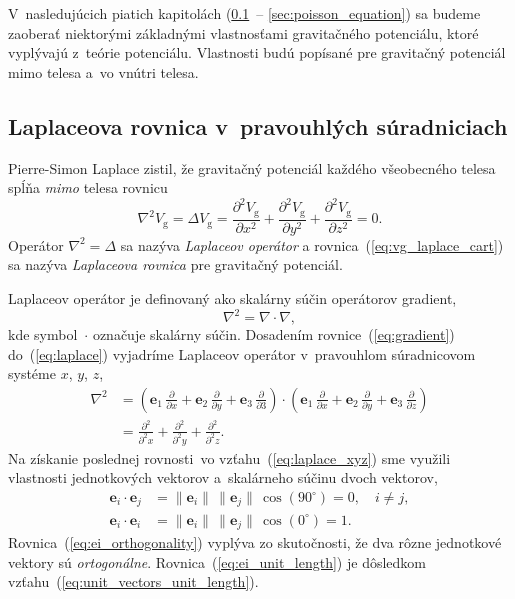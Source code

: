 \documentclass[a4paper,12pt]{book}
\newcommand{\gidx}{\mathrm g}
\let\vec\mathbf
\begin{document}
V~nasledujúcich piatich kapitolách (\ref{sec:laplace_equation_cart}~--
\ref{sec:poisson_equation}) sa budeme zaoberať niektorými základnými
vlastnosťami gravitačného potenciálu, ktoré vyplývajú z~teórie potenciálu.
Vlastnosti budú popísané pre gravitačný potenciál mimo telesa a~vo vnútri
telesa.





\subsection{Laplaceova rovnica v~pravouhlých súradniciach}
\label{sec:laplace_equation_cart}

Pierre-Simon Laplace zistil, že gravitačný potenciál každého všeobecného telesa
spĺňa \emph{mimo} telesa rovnicu
%
\begin{equation}
\label{eq:vg_laplace_cart}
\nabla^2 V_\gidx = \Delta V_\gidx = \frac{\partial^2 V_\gidx}{\partial x^2}
+ \frac{\partial^2 V_\gidx}{\partial y^2} + \frac{\partial^2 V_\gidx}{\partial
z^2} = 0{.}
\end{equation}
%
Operátor $\nabla^2 = \Delta$ sa nazýva \emph{Laplaceov operátor} 
a rovnica~(\ref{eq:vg_laplace_cart}) sa nazýva \emph{Laplaceova rovnica} pre
gravitačný potenciál.

Laplaceov operátor je definovaný ako skalárny súčin operátorov gradient,
%
\begin{equation}
\label{eq:laplace}
\nabla^2 = \nabla \cdot \nabla{,}
\end{equation}
%
kde symbol~$\cdot$ označuje skalárny súčin.  Dosadením 
rovnice~(\ref{eq:gradient}) do~(\ref{eq:laplace}) vyjadríme Laplaceov operátor 
v~pravouhlom súradnicovom systéme $x$, $y$, $z$,
%
\begin{equation}
\label{eq:laplace_xyz}
\begin{split}
\nabla^2 &= \left( \vec e_1 \, \frac{\partial}{\partial x} + \vec e_2 \, 
\frac{\partial}{\partial y} + \vec e_3 \, \frac{\partial}{\partial 3} \right) 
\cdot \left( \vec e_1 \, \frac{\partial}{\partial x} + \vec e_2 \, 
\frac{\partial}{\partial y} + \vec e_3 \, \frac{\partial}{\partial z} \right)\\
%
&= \frac{\partial^2}{\partial^2 x} + \frac{\partial^2}{\partial^2 y} 
+ \frac{\partial^2}{\partial^2 z}{.}
\end{split}
\end{equation}
%
Na získanie poslednej rovnosti~vo vzťahu~(\ref{eq:laplace_xyz}) sme využili 
vlastnosti jednotkových vektorov a~skalárneho súčinu dvoch vektorov,
%
\begin{align}
\label{eq:ei_orthogonality}
\vec e_i \cdot \vec e_j &= \| \vec e_i \| \, \| \vec e_j \| \, \cos(90^\circ) 
= 0{,} \quad i \neq j{,}\\
%
\label{eq:ei_unit_length}
\vec e_i \cdot \vec e_i &= \| \vec e_i \| \, \| \vec e_j \| \, \cos(0^\circ) 
= 1{.}
\end{align}
%
Rovnica~(\ref{eq:ei_orthogonality}) vyplýva zo skutočnosti, že dva rôzne 
jednotkové vektory sú \emph{ortogonálne}.  Rovnica~(\ref{eq:ei_unit_length}) je 
dôsledkom vzťahu~(\ref{eq:unit_vectors_unit_length}).
\end{document}
